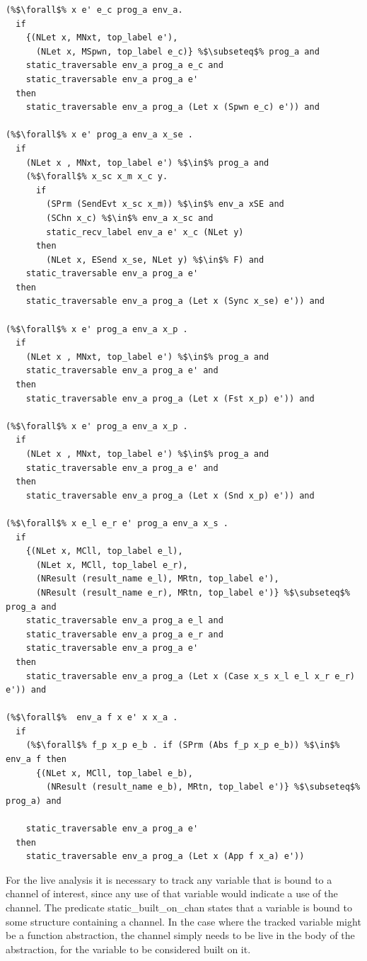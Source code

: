 \documentclass{article}
\begin{document}
\begin{lstlisting}[language=logic, escapechar=\%]
(%$\forall$% x e' e_c prog_a env_a.
  if
    {(NLet x, MNxt, top_label e'),
      (NLet x, MSpwn, top_label e_c)} %$\subseteq$% prog_a and
    static_traversable env_a prog_a e_c and
    static_traversable env_a prog_a e'
  then
    static_traversable env_a prog_a (Let x (Spwn e_c) e')) and

(%$\forall$% x e' prog_a env_a x_se .
  if
    (NLet x , MNxt, top_label e') %$\in$% prog_a and
    (%$\forall$% x_sc x_m x_c y.
      if
        (SPrm (SendEvt x_sc x_m)) %$\in$% env_a xSE and 
        (SChn x_c) %$\in$% env_a x_sc and
        static_recv_label env_a e' x_c (NLet y)
      then
        (NLet x, ESend x_se, NLet y) %$\in$% F) and
    static_traversable env_a prog_a e'
  then
    static_traversable env_a prog_a (Let x (Sync x_se) e')) and

(%$\forall$% x e' prog_a env_a x_p .
  if
    (NLet x , MNxt, top_label e') %$\in$% prog_a and
    static_traversable env_a prog_a e' and
  then
    static_traversable env_a prog_a (Let x (Fst x_p) e')) and

(%$\forall$% x e' prog_a env_a x_p .
  if
    (NLet x , MNxt, top_label e') %$\in$% prog_a and
    static_traversable env_a prog_a e' and
  then
    static_traversable env_a prog_a (Let x (Snd x_p) e')) and

(%$\forall$% x e_l e_r e' prog_a env_a x_s .
  if
    {(NLet x, MCll, top_label e_l),
      (NLet x, MCll, top_label e_r),
      (NResult (result_name e_l), MRtn, top_label e'),
      (NResult (result_name e_r), MRtn, top_label e')} %$\subseteq$% prog_a and
    static_traversable env_a prog_a e_l and
    static_traversable env_a prog_a e_r and
    static_traversable env_a prog_a e'
  then
    static_traversable env_a prog_a (Let x (Case x_s x_l e_l x_r e_r) e')) and
  
(%$\forall$%  env_a f x e' x x_a .
  if
    (%$\forall$% f_p x_p e_b . if (SPrm (Abs f_p x_p e_b)) %$\in$% env_a f then 
      {(NLet x, MCll, top_label e_b),
        (NResult (result_name e_b), MRtn, top_label e')} %$\subseteq$% prog_a) and

    static_traversable env_a prog_a e'
  then
    static_traversable env_a prog_a (Let x (App f x_a) e'))

  \end{lstlisting}


For the live analysis it is necessary to track any variable that is bound to a channel of
interest, since any use of that variable would indicate a use of the channel. The predicate
static\_built\_on\_chan states that a variable is bound to some structure containing a channel. 
In the case where the tracked variable might be a function abstraction, the channel simply
needs to be live in the body of the abstraction, for the variable to be considered built on it.
\end{document}
